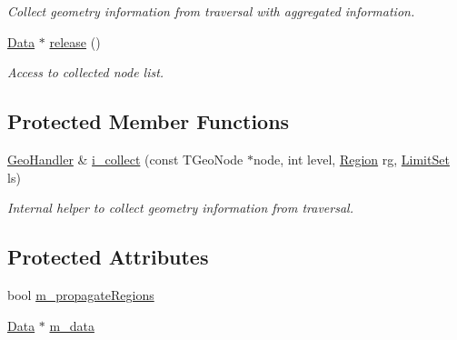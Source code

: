 \begin{DoxyCompactItemize}
\begin{DoxyCompactList}\small\item\em Collect geometry information from traversal with aggregated information. \end{DoxyCompactList}\item 
\hyperlink{class_d_d4hep_1_1_geometry_1_1_geo_handler_types_a568935b7e878d3ea9fe97a2ecf33d641}{Data} $\ast$ \hyperlink{class_d_d4hep_1_1_geometry_1_1_geo_handler_afaa693916e577c74e90854f66123cc05}{release} ()
\begin{DoxyCompactList}\small\item\em Access to collected node list. \end{DoxyCompactList}\end{DoxyCompactItemize}
\subsection*{Protected Member Functions}
\begin{DoxyCompactItemize}
\item 
\hyperlink{class_d_d4hep_1_1_geometry_1_1_geo_handler}{Geo\+Handler} \& \hyperlink{class_d_d4hep_1_1_geometry_1_1_geo_handler_ab075dd24d4b494b1f6b8508e39d6426b}{i\+\_\+collect} (const T\+Geo\+Node $\ast$node, int level, \hyperlink{class_d_d4hep_1_1_geometry_1_1_region}{Region} rg, \hyperlink{class_d_d4hep_1_1_geometry_1_1_limit_set}{Limit\+Set} ls)
\begin{DoxyCompactList}\small\item\em Internal helper to collect geometry information from traversal. \end{DoxyCompactList}\end{DoxyCompactItemize}
\subsection*{Protected Attributes}
\begin{DoxyCompactItemize}
\item 
bool \hyperlink{class_d_d4hep_1_1_geometry_1_1_geo_handler_a8fa03e76401899e921dffb88684e89be}{m\+\_\+propagate\+Regions}
\item 
\hyperlink{class_d_d4hep_1_1_geometry_1_1_geo_handler_types_a568935b7e878d3ea9fe97a2ecf33d641}{Data} $\ast$ \hyperlink{class_d_d4hep_1_1_geometry_1_1_geo_handler_a2ac33960ec9497e7a5f064c3ae0a0747}{m\+\_\+data}
\end{DoxyCompactItemize}
